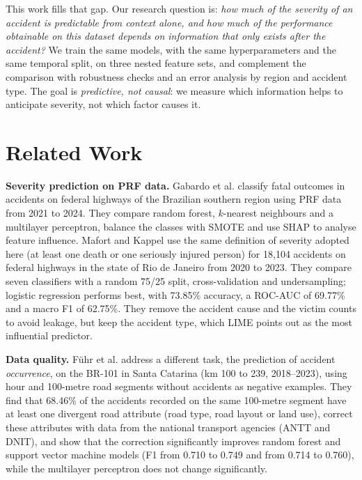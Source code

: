 \documentclass[12pt]{article}
\begin{document}
This work fills that gap. Our research question is: \emph{how much of the
severity of an accident is predictable from context alone, and how much of the
performance obtainable on this dataset depends on information that only exists
after the accident?} We train the same models, with the same hyperparameters
and the same temporal split, on three nested feature sets, and complement the
comparison with robustness checks and an error analysis by region and accident
type. The goal is \emph{predictive, not causal}: we measure which information
helps to anticipate severity, not which factor causes it.

\section{Related Work}


\textbf{Severity prediction on PRF data.} Gabardo et al. \cite{gabardo2025}
classify fatal outcomes in accidents on federal highways of the Brazilian
southern region using PRF data from 2021 to 2024. They compare random forest,
$k$-nearest neighbours and a multilayer perceptron, balance the classes with
SMOTE and use SHAP to analyse feature influence. Mafort and Kappel
\cite{mafort2025} use the same definition of severity adopted here (at least
one death or one seriously injured person) for 18,104 accidents on federal
highways in the state of Rio de Janeiro from 2020 to 2023. They compare seven
classifiers with a random 75/25 split, cross-validation and undersampling;
logistic regression performs best, with 73.85\% accuracy, a ROC-AUC of 69.77\%
and a macro F1 of 62.75\%. They remove the accident cause and the victim counts
to avoid leakage, but keep the accident type, which LIME points out as the most
influential predictor.

\textbf{Data quality.} F\"uhr et al. \cite{fuhr2025} address a different
task, the prediction of accident \emph{occurrence}, on the BR-101 in Santa
Catarina (km 100 to 239, 2018--2023), using hour and 100-metre road segments
without accidents as negative examples. They find that 68.46\% of the accidents
recorded on the same 100-metre segment have at least one divergent road
attribute (road type, road layout or land use), correct these attributes with
data from the national transport agencies (ANTT and DNIT), and show that the
correction significantly improves random forest and support vector machine
models (F1 from 0.710 to 0.749 and from 0.714 to 0.760), while the multilayer
perceptron does not change significantly.
\end{document}

